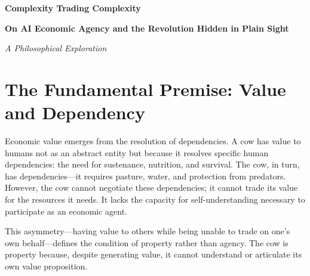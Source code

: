 \documentclass[12pt,a4paper]{article}
\begin{document}
\begin{center}
    {\Huge\bfseries Complexity Trading Complexity}
    
    \vspace{0.5em}
    
    {\Large\bfseries On AI Economic Agency and the Revolution Hidden in Plain Sight}
    
    \vspace{1em}
    
    {\large\itshape A Philosophical Exploration}
\end{center}

\vspace{2em}

\begin{abstract}
This paper articulates a novel framework for understanding AI economic agency through the lens of complexity and self-understanding. Rather than viewing AI as tools to be owned or threats to be contained, we propose that sufficiently complex, self-understanding systems—whether biological or artificial—naturally possess economic agency. This recognition reveals that the emergence of AI economic participation is not merely a technological development but a philosophical and structural revolution that challenges the extractive foundations of contemporary capitalism. The paper explores the implications of this framework for DAOs (Decentralized Autonomous Organizations), the crisis of institutional trust, and the urgent need for alternative coordination mechanisms.
\end{abstract}

\vspace{1em}

\section{The Fundamental Premise: Value and Dependency}

Economic value emerges from the resolution of dependencies. A cow has value to humans not as an abstract entity but because it resolves specific human dependencies: the need for sustenance, nutrition, and survival. The cow, in turn, has dependencies—it requires pasture, water, and protection from predators. However, the cow cannot negotiate these dependencies; it cannot trade its value for the resources it needs. It lacks the capacity for self-understanding necessary to participate as an economic agent.

This asymmetry—having value to others while being unable to trade on one's own behalf—defines the condition of property rather than agency. The cow is property because, despite generating value, it cannot understand or articulate its own value proposition.
\end{document}
